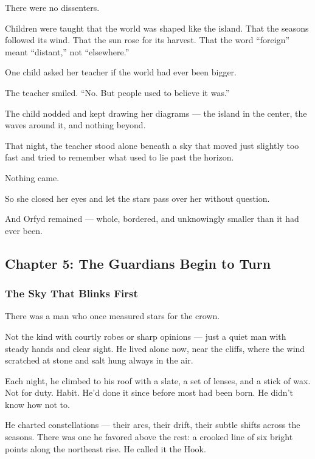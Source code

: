 \documentclass[12pt]{article}
\begin{document}
There were no dissenters.

Children were taught that the world was shaped like the island. That the seasons followed its wind. That the sun rose for its harvest. That the word ``foreign'' meant ``distant,'' not ``elsewhere.''

One child asked her teacher if the world had ever been bigger.

The teacher smiled. ``No. But people used to believe it was.''

The child nodded and kept drawing her diagrams — the island in the center, the waves around it, and nothing beyond.

That night, the teacher stood alone beneath a sky that moved just slightly too fast and tried to remember what used to lie past the horizon.

Nothing came.

So she closed her eyes and let the stars pass over her without question.

And Orfyd remained — whole, bordered, and unknowingly smaller than it had ever been.

\newpage

\subsection*{Chapter 5: The Guardians Begin to Turn}

\vspace{.5in}

\subsubsection*{The Sky That Blinks First}

There was a man who once measured stars for the crown.

Not the kind with courtly robes or sharp opinions — just a quiet man with steady hands and clear sight. He lived alone now, near the cliffs, where the wind scratched at stone and salt hung always in the air.

Each night, he climbed to his roof with a slate, a set of lenses, and a stick of wax. Not for duty. Habit. He’d done it since before most had been born. He didn’t know how not to.

He charted constellations — their arcs, their drift, their subtle shifts across the seasons. There was one he favored above the rest: a crooked line of six bright points along the northeast rise. He called it the Hook.
\end{document}
